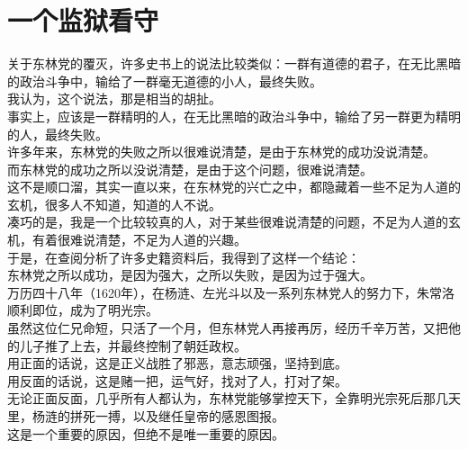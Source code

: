 \section{一个监狱看守}
\ifnum{}
	\begin{multicols}{\theparacolNo}
\fi
关于东林党的覆灭，许多史书上的说法比较类似：一群有道德的君子，在无比黑暗的政治斗争中，输给了一群毫无道德的小人，最终失败。\\

我认为，这个说法，那是相当的胡扯。\\

事实上，应该是一群精明的人，在无比黑暗的政治斗争中，输给了另一群更为精明的人，最终失败。\\

许多年来，东林党的失败之所以很难说清楚，是由于东林党的成功没说清楚。\\

而东林党的成功之所以没说清楚，是由于这个问题，很难说清楚。\\

这不是顺口溜，其实一直以来，在东林党的兴亡之中，都隐藏着一些不足为人道的玄机，很多人不知道，知道的人不说。\\

凑巧的是，我是一个比较较真的人，对于某些很难说清楚的问题，不足为人道的玄机，有着很难说清楚，不足为人道的兴趣。\\

于是，在查阅分析了许多史籍资料后，我得到了这样一个结论：\\

东林党之所以成功，是因为强大，之所以失败，是因为过于强大。\\

万历四十八年（1620年），在杨涟、左光斗以及一系列东林党人的努力下，朱常洛顺利即位，成为了明光宗。\\

虽然这位仁兄命短，只活了一个月，但东林党人再接再厉，经历千辛万苦，又把他的儿子推了上去，并最终控制了朝廷政权。\\

用正面的话说，这是正义战胜了邪恶，意志顽强，坚持到底。\\

用反面的话说，这是赌一把，运气好，找对了人，打对了架。\\

无论正面反面，几乎所有人都认为，东林党能够掌控天下，全靠明光宗死后那几天里，杨涟的拼死一搏，以及继任皇帝的感恩图报。\\

这是一个重要的原因，但绝不是唯一重要的原因。\\


\end{multicols}
